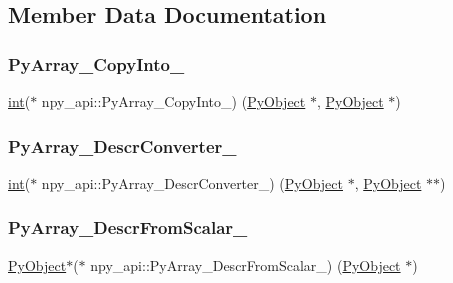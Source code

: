 \subsection{Member Data Documentation}
\mbox{\label{structnpy__api_a7d5205f195d633125051fe3ade860062}} 
\subsubsection{\texorpdfstring{PyArray\_CopyInto\_}{PyArray\_CopyInto\_}}
{\footnotesize\ttfamily \mbox{\hyperlink{warnings_8h_a74f207b5aa4ba51c3a2ad59b219a423b}{int}}($\ast$ npy\+\_\+api\+::\+Py\+Array\+\_\+\+Copy\+Into\+\_\+) (\mbox{\hyperlink{_python27_2object_8h_aadc84ac7aed2cfa6f20c25f62bf3dac7}{Py\+Object}} $\ast$, \mbox{\hyperlink{_python27_2object_8h_aadc84ac7aed2cfa6f20c25f62bf3dac7}{Py\+Object}} $\ast$)}

\mbox{\label{structnpy__api_a194b80a44e3e6fe70a42feb0d01d242e}} 
\subsubsection{\texorpdfstring{PyArray\_DescrConverter\_}{PyArray\_DescrConverter\_}}
{\footnotesize\ttfamily \mbox{\hyperlink{warnings_8h_a74f207b5aa4ba51c3a2ad59b219a423b}{int}}($\ast$ npy\+\_\+api\+::\+Py\+Array\+\_\+\+Descr\+Converter\+\_\+) (\mbox{\hyperlink{_python27_2object_8h_aadc84ac7aed2cfa6f20c25f62bf3dac7}{Py\+Object}} $\ast$, \mbox{\hyperlink{_python27_2object_8h_aadc84ac7aed2cfa6f20c25f62bf3dac7}{Py\+Object}} $\ast$$\ast$)}

\mbox{\label{structnpy__api_a6a3a67e5494d56be530dac55b4f8c0e9}} 
\subsubsection{\texorpdfstring{PyArray\_DescrFromScalar\_}{PyArray\_DescrFromScalar\_}}
{\footnotesize\ttfamily \mbox{\hyperlink{_python27_2object_8h_aadc84ac7aed2cfa6f20c25f62bf3dac7}{Py\+Object}}$\ast$($\ast$ npy\+\_\+api\+::\+Py\+Array\+\_\+\+Descr\+From\+Scalar\+\_\+) (\mbox{\hyperlink{_python27_2object_8h_aadc84ac7aed2cfa6f20c25f62bf3dac7}{Py\+Object}} $\ast$)}

